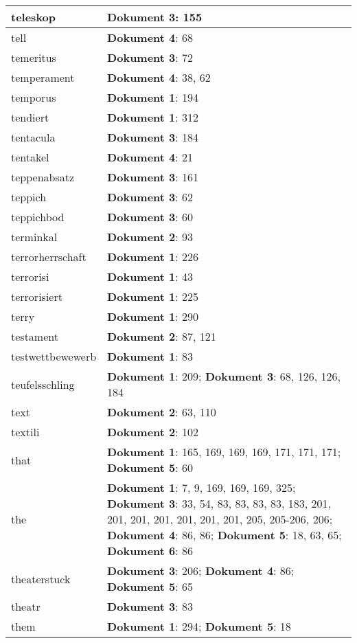 \documentclass[a5paper]{article}
\begin{document}
\begin{longtable}[l]{|l|p{3in}|}
\hline
teleskop & \textbf{Dokument 3}: 155 \\
\hline
tell & \textbf{Dokument 4}: 68 \\
\hline
temeritus & \textbf{Dokument 3}: 72 \\
\hline
temperament & \textbf{Dokument 4}: 38, 62 \\
\hline
temporus & \textbf{Dokument 1}: 194 \\
\hline
tendiert & \textbf{Dokument 1}: 312 \\
\hline
tentacula & \textbf{Dokument 3}: 184 \\
\hline
tentakel & \textbf{Dokument 4}: 21 \\
\hline
teppenabsatz & \textbf{Dokument 3}: 161 \\
\hline
teppich & \textbf{Dokument 3}: 62 \\
\hline
teppichbod & \textbf{Dokument 3}: 60 \\
\hline
terminkal & \textbf{Dokument 2}: 93 \\
\hline
terrorherrschaft & \textbf{Dokument 1}: 226 \\
\hline
terrorisi & \textbf{Dokument 1}: 43 \\
\hline
terrorisiert & \textbf{Dokument 1}: 225 \\
\hline
terry & \textbf{Dokument 1}: 290 \\
\hline
testament & \textbf{Dokument 2}: 87, 121 \\
\hline
testwettbewewerb & \textbf{Dokument 1}: 83 \\
\hline
teufelsschling & \textbf{Dokument 1}: 209; \textbf{Dokument 3}: 68, 126, 126, 184 \\
\hline
text & \textbf{Dokument 2}: 63, 110 \\
\hline
textili & \textbf{Dokument 2}: 102 \\
\hline
that & \textbf{Dokument 1}: 165, 169, 169, 169, 171, 171, 171; \textbf{Dokument 5}: 60 \\
\hline
the & \textbf{Dokument 1}: 7, 9, 169, 169, 169, 325; \textbf{Dokument 3}: 33, 54, 83, 83, 83, 83, 183, 201, 201, 201, 201, 201, 201, 201, 205, 205-206, 206; \textbf{Dokument 4}: 86, 86; \textbf{Dokument 5}: 18, 63, 65; \textbf{Dokument 6}: 86 \\
\hline
theaterstuck & \textbf{Dokument 3}: 206; \textbf{Dokument 4}: 86; \textbf{Dokument 5}: 65 \\
\hline
theatr & \textbf{Dokument 3}: 83 \\
\hline
them & \textbf{Dokument 1}: 294; \textbf{Dokument 5}: 18 \\

\end{longtable}
\end{document}
